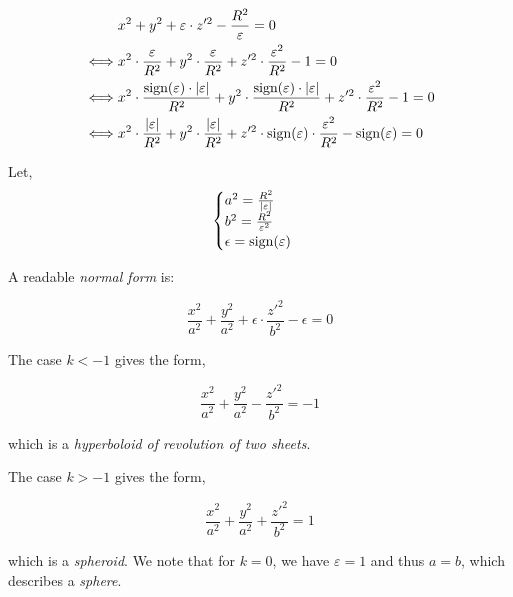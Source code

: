 \begin{equation} \begin{split}
& x^2 + y^2 + \varepsilon \cdot z'^2 - \frac{R^2}{\varepsilon} = 0 \\
\iff & x^2 \cdot \frac{\varepsilon}{R^2} + y^2 \cdot \frac{\varepsilon}{R^2} +
       z'^2 \cdot \frac{\varepsilon^2}{R^2} - 1 = 0 \\
\iff & x^2 \cdot \frac{\textrm{sign}(\varepsilon) \cdot \abs{\varepsilon}}{R^2} +
       y^2 \cdot \frac{\textrm{sign}(\varepsilon) \cdot \abs{\varepsilon}}{R^2} +
       z'^2 \cdot \frac{\varepsilon^2}{R^2} - 1 = 0 \\
\iff & x^2 \cdot \frac{\abs{\varepsilon}}{R^2} + y^2 \cdot \frac{\abs{\varepsilon}}{R^2} +
       z'^2 \cdot \textrm{sign}(\varepsilon) \cdot \frac{\varepsilon^2}{R^2} - \textrm{sign}(\varepsilon)
       = 0
\end{split} \end{equation}

Let,
\begin{equation} \begin{cases}
a^2 = \frac{R^2}{\abs{\varepsilon}} \\
b^2 = \frac{R^2}{\varepsilon^2} \\
\epsilon = \textrm{sign}(\varepsilon)
\end{cases} \end{equation}

A readable \emph{normal form} is:

\begin{equation}
\frac{x^2}{a^2} + \frac{y^2}{a^2} + \epsilon \cdot \frac{z'^2}{b^2} - \epsilon
  = 0
\end{equation}

The case $k < -1$ gives the form,

\begin{equation}
\frac{x^2}{a^2} + \frac{y^2}{a^2} - \frac{z'^2}{b^2} = -1
\end{equation}

which is a \emph{hyperboloid of revolution of two sheets}.

The case $k > -1$ gives the form,

\begin{equation}
\frac{x^2}{a^2} + \frac{y^2}{a^2} + \frac{z'^2}{b^2} = 1
\end{equation}

which is a \emph{spheroid}. We note that for $k=0$, we have
$\varepsilon=1$ and thus $a=b$, which describes a \emph{sphere}.

